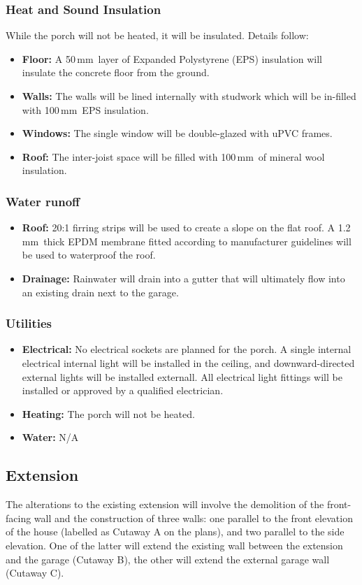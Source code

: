 \documentclass{extension}
\newcommand{\mm}{\,$\mathrm{mm}$}
\begin{document}
\subsubsection{Heat and Sound Insulation}
While the porch will not be heated, it will be insulated. Details follow:
\begin{itemize}
  \item {\bf Floor:} A 50\mm\ layer of Expanded Polystyrene (EPS)\cite{pfins} insulation will insulate the concrete floor from the ground.
  \item {\bf Walls:} The walls will be lined internally with studwork which will be in-filled with 100\mm\ EPS insulation.
  \item {\bf Windows:} The single window will be double-glazed with uPVC frames.
  \item {\bf Roof:} The inter-joist space will be filled with 100\mm\ of mineral wool insulation.\cite{prins}
\end{itemize}
\subsubsection{Water runoff}
\begin{itemize}
  \item {\bf Roof:} 20:1 firring strips will be used to create a slope on the flat roof. A 1.2\mm\ thick EPDM membrane\cite{prmem} fitted according to manufacturer guidelines will be used to waterproof the roof.
  \item {\bf Drainage:} Rainwater will drain into a gutter that will ultimately flow into an existing drain next to the garage.
\end{itemize}
\subsubsection{Utilities}
\begin{itemize}
  \item {\bf Electrical:} No electrical sockets are planned for the porch. A single internal electrical internal light will be installed in the ceiling, and downward-directed external lights will be installed externall. All electrical light fittings will be installed or approved by a qualified electrician.
  \item {\bf Heating:} The porch will not be heated.
  \item {\bf Water:} N/A
\end{itemize}

\subsection{Extension}
\label{extension}
The alterations to the existing extension will involve the demolition of the front-facing wall and the construction of three walls: one parallel to the front elevation of the house (labelled as Cutaway A on the plans), and two parallel to the side elevation. One of the latter will extend the existing wall between the extension and the garage (Cutaway B), the other will extend the external garage wall (Cutaway C).
\end{document}
